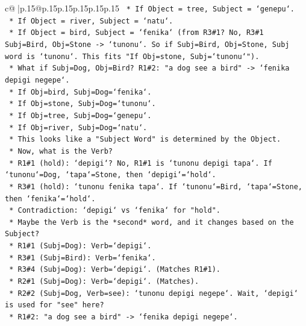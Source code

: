 \documentclass{article}
\begin{document}
{\begin{supertabular}{c@{$\;$}|p{.15\linewidth}@{}p{.15\linewidth}p{.15\linewidth}p{.15\linewidth}p{.15\linewidth}p{.15\linewidth}}
{{{\texttt{            *   If Object = tree, Subject = `genepu`.} \\
\texttt{            *   If Object = river, Subject = `natu`.} \\
\texttt{            *   If Object = bird, Subject = `fenika` (from R3\#1? No, R3\#1 Subj=Bird, Obj=Stone {-}> `tunonu`. So if Subj=Bird, Obj=Stone, Subj word is `tunonu`. This fits "If Obj=stone, Subj=`tunonu`").} \\
\texttt{            *   What if Subj=Dog, Obj=Bird? R1\#2: "a dog see a bird" {-}> `fenika depigi negepe`.} \\
\texttt{                *   If Obj=bird, Subj=Dog=`fenika`.} \\
\texttt{                *   If Obj=stone, Subj=Dog=`tunonu`.} \\
\texttt{                *   If Obj=tree, Subj=Dog=`genepu`.} \\
\texttt{                *   If Obj=river, Subj=Dog=`natu`.} \\
\texttt{            *   This looks like a "Subject Word" is determined by the Object.} \\
\texttt{            *   Now, what is the Verb?} \\
\texttt{                *   R1\#1 (hold): `depigi`? No, R1\#1 is `tunonu depigi tapa`. If `tunonu`=Dog, `tapa`=Stone, then `depigi`=`hold`.} \\
\texttt{                *   R3\#1 (hold): `tunonu fenika tapa`. If `tunonu`=Bird, `tapa`=Stone, then `fenika`=`hold`.} \\
\texttt{                *   Contradiction: `depigi` vs `fenika` for "hold".} \\
\texttt{                *   Maybe the Verb is the *second* word, and it changes based on the Subject?} \\
\texttt{                    *   R1\#1 (Subj=Dog): Verb=`depigi`.} \\
\texttt{                    *   R3\#1 (Subj=Bird): Verb=`fenika`.} \\
\texttt{                    *   R3\#4 (Subj=Dog): Verb=`depigi`. (Matches R1\#1).} \\
\texttt{                    *   R2\#1 (Subj=Dog): Verb=`depigi`. (Matches).} \\
\texttt{                    *   R2\#2 (Subj=Dog, Verb=see): `tunonu depigi negepe`. Wait, `depigi` is used for "see" here?} \\
\texttt{                        *   R1\#2: "a dog see a bird" {-}> `fenika depigi negepe`.} \\
}}}
\end{supertabular}}
\end{document}
